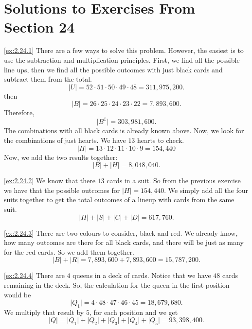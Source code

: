 \section{Solutions to Exercises From Section 24}
\begin{solution}\label{sol:2.24.1}\ref{ex:2.24.1}
    There are a few ways to solve this problem. However, the easiest is to use the subtraction and multiplication principles. First, we find all the possible line ups, then we find all the possible outcomes with just black cards and subtract them from the total. 
    $$
    \lvert U \rvert=52\cdot 51\cdot 50\cdot 49\cdot 48=311,975,200.
    $$
    then 
    $$
    \lvert B \rvert=26\cdot 25\cdot 24\cdot 23\cdot 22= 7, 893,600.
    $$
    Therefore, 
    $$
    \lvert B^{\complement} \rvert=303,981,600.
    $$
    The combinations with all black cards is already known above. Now, we look for the combinations of just hearts. We have $13$ hearts to check. 
    $$
    \lvert H \rvert=13\cdot 12\cdot 11\cdot 10 \cdot 9=154,440
    $$
    Now, we add the two results together:
    $$
    \lvert B \rvert+\lvert H \rvert=8,048,040.
    $$
\end{solution}

\begin{solution}\label{sol:2.24.2}\ref{ex:2.24.2}
    We know that there $13$ cards in a suit. So from the previous exercise we have that the possible outcomes for $\lvert H \rvert=154,440$. We simply add all the four suits together to get the total outcomes of a lineup with cards from the same suit. 
    $$
    \lvert H \rvert+\lvert S \rvert+\lvert C \rvert+\lvert D \rvert=617,760.
    $$   
\end{solution}

\begin{solution}\label{sol:2.24.3}\ref{ex:2.24.3}
    There are two colours to consider, black and red. We already know, how many outcomes are there for all black cards, and there will be just as many for the red cards. So we add them together. 
    $$
    \lvert B \rvert+\lvert R \rvert=7,893,600+7,893,600=15,787,200.
    $$
\end{solution}

\begin{solution}\label{sol:2.24.4}\ref{ex:2.24.4}
    There are $4$ queens in a deck of cards. Notice that we have $48$ cards remaining in the deck. So, the calculation for the queen in the first position would be 
    $$
    \lvert Q_1 \rvert=4\cdot 48\cdot 47\cdot 46\cdot 45=18,679,680.
    $$
    We multiply that result by $5$, for each position and we get 
    $$
    \lvert Q \rvert=\lvert Q_1 \rvert+\lvert Q_2 \rvert+\lvert Q_3 \rvert+\lvert Q_4 \rvert+\lvert Q_5 \rvert=93,398,400.
    $$
\end{solution}

